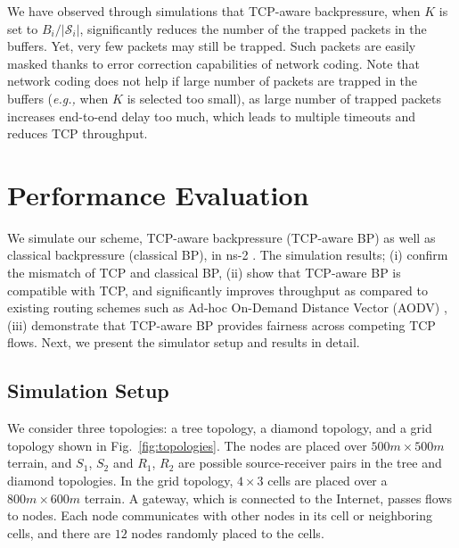 \documentclass[conference]{IEEEtran}
\newcommand{\eg}{{\em e.g., }}
\newcommand{\Sset}{\mathcal{S}}
\begin{document}
We have observed through simulations that TCP-aware backpressure, when $K$ is set to $B_{i} / |\Sset_{i}|$, significantly reduces the number of the trapped packets in the buffers. Yet, very few packets may still be trapped. Such packets are easily masked thanks to error correction capabilities of network coding. Note that network coding does not help if large number of packets are trapped in the buffers (\eg when $K$ is selected too small), as large number of trapped packets increases end-to-end delay too much, which leads to multiple timeouts and reduces TCP throughput.





\section{Performance Evaluation}\label{sec:performance}
We simulate our scheme, TCP-aware backpressure (TCP-aware BP) as well as classical backpressure (classical BP), in ns-2 \cite{ns2}. The simulation results; (i) confirm the mismatch of TCP and classical BP, (ii) show that TCP-aware BP is compatible with TCP, and significantly improves throughput as compared to existing routing schemes such as Ad-hoc On-Demand Distance Vector (AODV) \cite{aodv}, (iii) demonstrate that TCP-aware BP provides fairness across competing TCP flows. Next, we present the simulator setup and results in detail.

\begin{figure*}[t!]
\vspace{-5pt}
\centering
{}
\vspace{-5pt}
\caption{\scriptsize Topologies used in simulations; (a) tree topology, (b) diamond topology, (c) grid topology.}
\vspace{-15pt}
\label{fig:topologies}
\end{figure*}





\subsection{Simulation Setup}
We consider three topologies: a tree topology, a diamond topology, and a grid topology shown in Fig.~\ref{fig:topologies}. The nodes are placed over $500m \times 500m$ terrain, and $S_1$, $S_2$ and $R_1$, $R_2$ are possible source-receiver pairs in the tree and diamond topologies. In the grid topology, $4 \times 3$ cells are placed over a $800m \times 600m$ terrain. A gateway, which is connected to the Internet, passes flows to nodes. Each node communicates with other nodes in its cell or neighboring cells, and there are $12$ nodes randomly placed to the cells.
\end{document}
